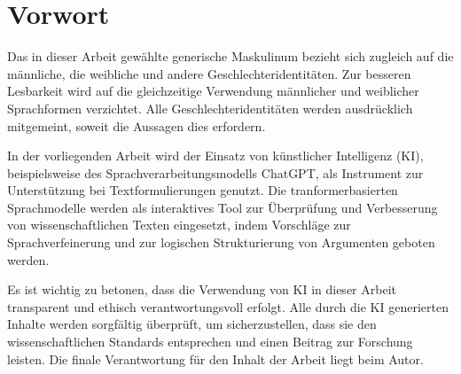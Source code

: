 \chapter{Vorwort}

Das in dieser Arbeit gewählte generische Maskulinum bezieht sich zugleich auf die männliche, die weibliche und andere Geschlechteridentitäten. Zur besseren Lesbarkeit wird auf die gleichzeitige Verwendung männlicher und weiblicher Sprachformen verzichtet. Alle Geschlechteridentitäten werden ausdrücklich mitgemeint, soweit die Aussagen dies erfordern.



In der vorliegenden Arbeit wird der Einsatz von künstlicher Intelligenz (KI), beispielsweise des Sprachverarbeitungsmodells ChatGPT, als Instrument zur Unterstützung bei Textformulierungen genutzt. Die tranformerbasierten Sprachmodelle werden als interaktives Tool zur Überprüfung und Verbesserung von wissenschaftlichen Texten eingesetzt, indem Vorschläge zur Sprachverfeinerung und zur logischen Strukturierung von Argumenten geboten werden.

Es ist wichtig zu betonen, dass die Verwendung von KI in dieser Arbeit transparent und ethisch verantwortungsvoll erfolgt. Alle durch die KI generierten Inhalte werden sorgfältig überprüft, um sicherzustellen, dass sie den wissenschaftlichen Standards entsprechen und einen Beitrag zur Forschung leisten. Die finale Verantwortung für den Inhalt der Arbeit liegt beim Autor.
